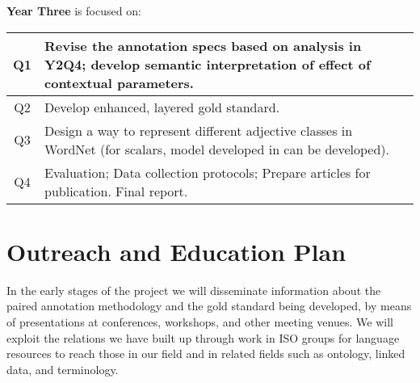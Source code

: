 \documentclass[10pt]{article}
\newcommand{\miniskip}{\vspace*{1mm}}
\begin{document}

\miniskip\noindent
{\bf Year Three} is focused on:  

\vspace{2mm}\noindent
{\small
\begin{tabularx}{470pt}{|c|X|}

\hline

Q1 & Revise the annotation specs based on analysis in Y2Q4; develop semantic interpretation of effect of contextual parameters. 
\\

\hline

Q2 & Develop enhanced, layered gold standard.  \\

\hline

Q3 &   Design a way to represent different adjective classes  in WordNet (for scalars, model developed in \cite{sheinmanetal2013} can be developed). \\

\hline

Q4 &  Evaluation; Data collection protocols; Prepare articles for publication.  Final report.\\

\hline

\end{tabularx}
}



\vspace {-4mm}
\section{Outreach and Education Plan}

\vspace {-3mm}


 
In the early stages of the project we will disseminate information about the paired annotation methodology and the gold standard being developed,   by means of presentations at conferences, workshops, and other meeting venues. We will  exploit the relations we have built up through work in ISO groups for language resources to reach 
those in our field and
in related fields such as ontology, linked data, and terminology.  
\end{document}
